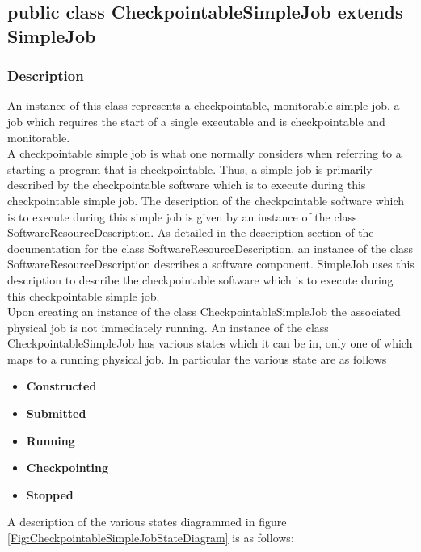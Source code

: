 \documentclass[$Date: 2003/06/26 19:29:31 $]{glabarticle}
\begin{document}
\newpage

\subsection{public class CheckpointableSimpleJob extends SimpleJob}


\subsubsection{Description}

An instance of this class represents a checkpointable, monitorable
simple job, a job which requires the start of a single executable and
is checkpointable and monitorable.\\

A checkpointable simple job is what one normally considers when
referring to a starting a program that is checkpointable. Thus, a
simple job is primarily described by the checkpointable software which
is to execute during this checkpointable simple job. The description
of the checkpointable software which is to execute during this simple
job is given by an instance of the class
SoftwareResourceDescription. As detailed in the description section of
the documentation for the class SoftwareResourceDescription, an
instance of the class SoftwareResourceDescription describes a software
component. SimpleJob uses this description to describe the
checkpointable software which is to execute during this checkpointable
simple job. \\

Upon creating an instance of the class CheckpointableSimpleJob the
associated physical job is not immediately running. An instance of the
class CheckpointableSimpleJob has various states which it can be in,
only one of which maps to a running physical job. In particular the
various state are as follows

\begin{itemize}
  \item \textbf{Constructed}
  \item \textbf{Submitted}
  \item \textbf{Running}
  \item \textbf{Checkpointing}
  \item \textbf{Stopped}
\end{itemize}
A description of the various states diagrammed in figure \ref{Fig:CheckpointableSimpleJobStateDiagram} 
is as follows:
\end{document}
